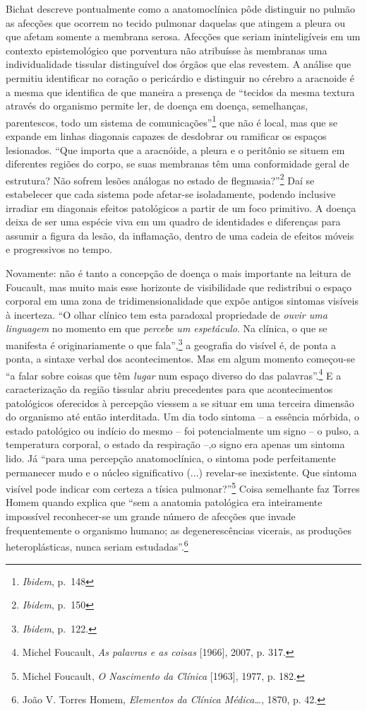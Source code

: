 Bichat descreve pontualmente como a anatomoclínica pôde distinguir no
pulmão as afecções que ocorrem no tecido pulmonar daquelas que atingem a
pleura ou que afetam somente a membrana serosa. Afecções que seriam
ininteligíveis em um contexto epistemológico que porventura não
atribuísse às membranas uma individualidade tissular distinguível dos
órgãos que elas revestem. A análise que permitiu identificar no coração
o pericárdio e distinguir no cérebro a aracnoide é a mesma que
identifica de que maneira a presença de ``tecidos da mesma textura
através do organismo permite ler, de doença em doença, semelhanças,
parentescos, todo um sistema de comunicações''\footnote{\emph{Ibidem},
  p.~148} que não é local, mas que se expande em linhas diagonais
capazes de desdobrar ou ramificar os espaços lesionados. ``Que importa
que a aracnóide, a pleura e o peritônio se situem em diferentes regiões
do corpo, se suas membranas têm uma conformidade geral de estrutura? Não
sofrem lesões análogas no estado de flegmasia?''\footnote{\emph{Ibidem},
  p.~150} Daí se estabelecer que cada sistema pode afetar-se
isoladamente, podendo inclusive irradiar em diagonais efeitos
patológicos a partir de um foco primitivo. A doença deixa de ser uma
espécie viva em um quadro de identidades e diferenças para assumir a
figura da lesão, da inflamação, dentro de uma cadeia de efeitos móveis e
progressivos no tempo.

Novamente: não é tanto a concepção de doença o mais importante na
leitura de Foucault, mas muito mais esse horizonte de visibilidade que
redistribui o espaço corporal em uma zona de tridimensionalidade que
expõe antigos sintomas visíveis à incerteza. ``O olhar clínico tem esta
paradoxal propriedade de \emph{ouvir uma linguagem} no momento em que
\emph{percebe um espetáculo}. Na clínica, o que se manifesta é
originariamente o que fala'',\footnote{\emph{Ibidem}, p.~122.} a
geografia do visível é, de ponta a ponta, a sintaxe verbal dos
acontecimentos. Mas em algum momento começou-se ``a falar sobre coisas
que têm \emph{lugar} num espaço diverso do das palavras''.\footnote{Michel
  Foucault, \emph{As palavras e as coisas} {[}1966{]}, 2007, p. 317.} E
a caracterização da região tissular abriu precedentes para que
acontecimentos patológicos oferecidos à percepção viessem a se situar em
uma terceira dimensão do organismo até então interditada. Um dia todo
sintoma -- a essência mórbida, o estado patológico ou indício do mesmo
-- foi potencialmente um signo -- o pulso, a temperatura corporal, o
estado da respiração --,o signo era apenas um sintoma lido. Já ``para
uma percepção anatomoclínica, o sintoma pode perfeitamente permanecer
mudo e o núcleo significativo (...) revelar-se inexistente. Que sintoma
visível pode indicar com certeza a tísica pulmonar?''\footnote{Michel
  Foucault, \emph{O Nascimento da Clínica} {[}1963{]}, 1977, p. 182.}
Coisa semelhante faz Torres Homem quando explica que ``sem a anatomia
patológica era inteiramente impossível reconhecer-se um grande número de
afecções que invade frequentemente o organismo humano; as
degenerescências vicerais, as produções heteroplásticas, nunca seriam
estudadas''.\footnote{João V. Torres Homem, \emph{Elementos da Clínica
  Médica\ldots{}}, 1870, p. 42.}


